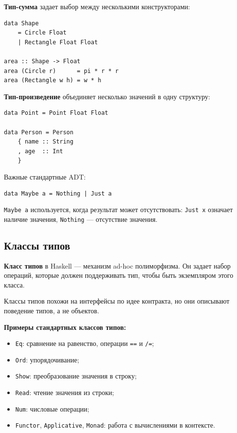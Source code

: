 \textbf{Тип-сумма} задает выбор между несколькими конструкторами:

\begin{verbatim}
data Shape
    = Circle Float
    | Rectangle Float Float

area :: Shape -> Float
area (Circle r)      = pi * r * r
area (Rectangle w h) = w * h
\end{verbatim}

\textbf{Тип-произведение} объединяет несколько значений в одну структуру:

\begin{verbatim}
data Point = Point Float Float

data Person = Person
    { name :: String
    , age  :: Int
    }
\end{verbatim}

Важные стандартные ADT:

\begin{verbatim}
data Maybe a = Nothing | Just a
\end{verbatim}

\texttt{Maybe a} используется, когда результат может отсутствовать: \texttt{Just x} означает наличие значения, \texttt{Nothing} --- отсутствие значения.

\subsection*{Классы типов}

\textbf{Класс типов} в Haskell --- механизм ad-hoc полиморфизма. Он задает набор операций, которые должен поддерживать тип, чтобы быть экземпляром этого класса.

Классы типов похожи на интерфейсы по идее контракта, но они описывают поведение типов, а не объектов.

\textbf{Примеры стандартных классов типов:}
\begin{itemize}
    \item \texttt{Eq}: сравнение на равенство, операции \texttt{==} и \texttt{/=};
    \item \texttt{Ord}: упорядочивание;
    \item \texttt{Show}: преобразование значения в строку;
    \item \texttt{Read}: чтение значения из строки;
    \item \texttt{Num}: числовые операции;
    \item \texttt{Functor}, \texttt{Applicative}, \texttt{Monad}: работа с вычислениями в контексте.
\end{itemize}

